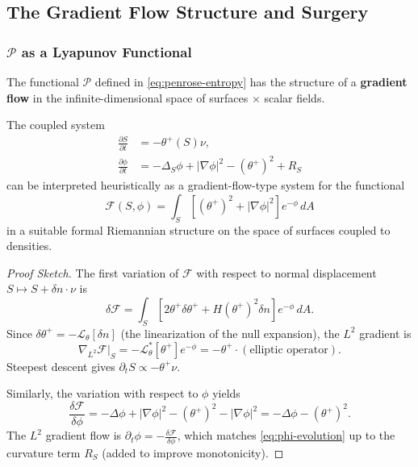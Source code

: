\subsection{The Gradient Flow Structure and Surgery}

\subsubsection{$\mathcal{P}$ as a Lyapunov Functional}

The functional $\mathcal{P}$ defined in \eqref{eq:penrose-entropy} has the structure of a \textbf{gradient flow} in the infinite-dimensional space of surfaces $\times$ scalar fields.

\begin{proposition}
\label{prop:gradient-structure}
The coupled system
\begin{align}
\frac{\partial S}{\partial t} &= -\theta^+(S)\nu, \\
\frac{\partial \phi}{\partial t} &= -\Delta_S\phi + |\nabla\phi|^2 - (\theta^+)^2 + R_S
\end{align}
can be interpreted heuristically as a gradient-flow-type system for the functional
\begin{equation}
\mathcal{F}(S, \phi) = \int_S \left[(\theta^+)^2 + |\nabla\phi|^2\right]e^{-\phi} \, dA
\end{equation}
in a suitable formal Riemannian structure on the space of surfaces coupled to densities.
\end{proposition}

\begin{proof}[Proof Sketch]
The first variation of $\mathcal{F}$ with respect to normal displacement $S \mapsto S + \delta n \cdot \nu$ is
\begin{equation}
\delta\mathcal{F} = \int_S \left[2\theta^+ \delta\theta^+ + H(\theta^+)^2 \delta n\right]e^{-\phi} \, dA.
\end{equation}
Since $\delta\theta^+ = -\mathcal{L}_\theta[\delta n]$ (the linearization of the null expansion), the $L^2$ gradient is
\begin{equation}
\nabla_{L^2}\mathcal{F}|_S = -\mathcal{L}_\theta^*[\theta^+] e^{-\phi} = -\theta^+ \cdot (\text{elliptic operator}).
\end{equation}
Steepest descent gives $\partial_t S \propto -\theta^+\nu$.

Similarly, the variation with respect to $\phi$ yields
\begin{equation}
\frac{\delta\mathcal{F}}{\delta\phi} = -\Delta\phi + |\nabla\phi|^2 - (\theta^+)^2 - |\nabla\phi|^2 = -\Delta\phi - (\theta^+)^2.
\end{equation}
The $L^2$ gradient flow is $\partial_t\phi = -\frac{\delta\mathcal{F}}{\delta\phi}$, which matches \eqref{eq:phi-evolution} up to the curvature term $R_S$ (added to improve monotonicity).
\end{proof}


